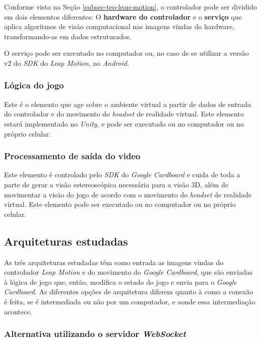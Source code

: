 Conforme visto na Seção \ref{subsec-teo-leap-motion}, o controlador pode 
ser dividido em dois elementos diferentes: O \textbf{hardware do controlador} e 
o \textbf{serviço} que aplica algoritmos de visão computacional nas imagens 
vindas do hardware, transformando-as em dados estruturados.

O serviço pode ser executado no computador ou, no caso de se utilizar a versão 
v2 do \textit{SDK} do \textit{Leap Motion}, no \textit{Android}.

\subsubsection{Lógica do jogo}\label{subsubsec-elemento-logica-jogo}

Este é o elemento que age sobre o ambiente virtual a partir de dados de entrada 
do controlador e do movimento do \textit{headset} de realidade virtual. 
Este elemento estará implementado no \textit{Unity}, e pode ser executado ou no 
computador ou no próprio celular.

\subsubsection{Processamento de saída do video}\label{subsubsec-elemento-video}

Este elemento é controlado pelo \textit{SDK} do \textit{Google Cardboard} e 
cuida de toda a parte de gerar a visão estereoscópica necessária para a visão 
3D, além de movimentar a visão do jogo de acordo com o movimento do 
\textit{headset} de realidade virtual. Este elemento pode ser executado ou 
no computador ou no próprio celular.

\subsection{Arquiteturas estudadas}\label{subsec-arquiteturas-estudadas}

As três arquiteturas estudadas têm como entrada as imagens vindas do 
controlador \textit{Leap Motion} e do movimento do \textit{Google Cardboard}, 
que são enviadas à lógica de jogo que, então, modifica o estado do jogo e envia 
para o \textit{Google Cardboard}. As diferentes opções de arquitetura diferem 
quanto à como a conexão é feita, se é intermediada ou não por um computador, e 
aonde essa intermediação acontece.

\subsubsection{Alternativa utilizando o servidor \textit{WebSocket}}\label{subsubsec-arquiteturas-leapmotion-pc-leapdata-android}

